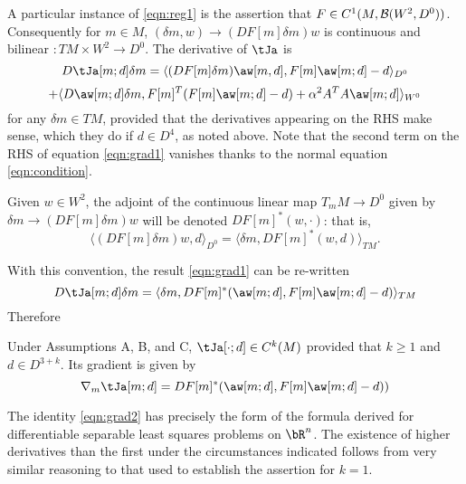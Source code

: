 A particular instance of \ref{eqn:reg1} is the assertion that $F \in
C^1(M,{\cal B}(W^2,D^0))$. Consequently for $m \in M$, $(\delta m,w)
\rightarrow (DF[m]\delta m)w$ is continuous and bilinear $:TM \times
W^2 \rightarrow D^0$. The derivative of $\tJa$ is
\[
    D\tJa[m;d]\delta m = \langle 
  (DF[m]\delta m)\aw[m,d],F[m]\aw[m;d]-d\rangle_{D^0}
\]
\begin{equation}
  \label{eqn:grad1}
 +\langle D\aw[m;d]\delta m,F[m]^T(F[m]\aw[m;d]-d)+\alpha^2A^TA\aw[m;d]\rangle_{W^0}
\end{equation}
for any $\delta m \in TM$, provided that the derivatives appearing on
the RHS make sense, which they do if $d \in D^4$, as noted above. Note
that the second term on the RHS of equation \ref{eqn:grad1} vanishes
thanks to the normal equation \ref{eqn:condition}.

Given $w \in
W^2$, the adjoint of the continuous linear map $T_mM \rightarrow D^0$
given by $\delta m \rightarrow
(DF[m]\delta m)w$ will be denoted $DF[m]^*(w,\cdot)$: that is,
\begin{equation}
  \label{eqn:madj}
  \langle (DF[m]\delta m)w,d\rangle_{D^0} = \langle \delta m,
  DF[m]^*(w,d)\rangle_{TM}.
\end{equation}
  
With this convention, the result \ref{eqn:grad1} can be re-written
\begin{equation}
  \label{eqn:deriv}
  D\tJa[m;d]\delta m = \langle \delta m, DF[m]^*(\aw[m;d], F[m]\aw[m;d]-d)\rangle_{TM}
\end{equation}
Therefore

\begin{theorem}\label{eqn:vpmgrad}
  Under Assumptions A, B, and C,  $\tJa[\cdot;d] \in C^k(M)$ provided
  that $k \ge 1$ and $d \in D^{3+k}$. Its gradient is given by
 \begin{equation}
   \nabla _{m} \tJa[m; d] = D F[m]^*(\aw[m;d],F[m]\aw[m;d]-d))
   \label{eqn:grad2}
 \end{equation}
 \end{theorem}
The identity \ref{eqn:grad2} has precisely the form of the formula derived
\cite{GolubPereyra:03,GolubPereyra:73} for differentiable separable
least squares problems on $\bR^n$. The existence of higher derivatives
than the first under the circumstances indicated follows from very
similar reasoning to that used to establish the assertion for $k=1$.
